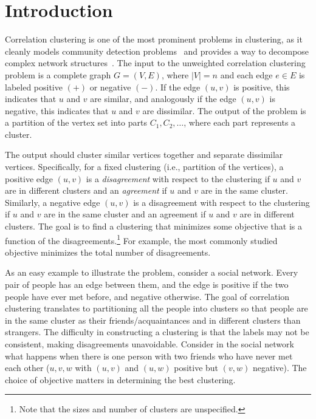 
\section{Introduction}
Correlation clustering is one of the most prominent problems in clustering, 
as it cleanly models community detection problems~\cite{veldt2018, SDELM21} and provides a way to decompose complex network structures~\cite{Wirth17, mccallum2004conditional}. 
The input to the unweighted correlation clustering problem is a complete graph $G=(V,E)$, where $|V|=n$ and each edge $e \in E$ is labeled positive $(+)$ or negative $(-)$.  
If the edge $(u,v)$ is positive, this indicates that $u$ and $v$ are similar, 
and analogously if the edge $(u,v)$ is negative, this indicates that $u$ and $v$ are dissimilar. 
The output of the problem is a partition of the vertex set into parts $C_1, C_2, \ldots$, where each part represents a cluster.   

The output should cluster similar vertices together and separate dissimilar vertices.
Specifically, for a fixed clustering (i.e., partition of the vertices), a positive edge $(u, v)$ is a \emph{disagreement} with respect to the clustering if $u$ and $v$ are in different clusters and an \emph{agreement} if $u$ and $v$ are in the same cluster.
Similarly, a negative edge $(u,v)$ is a disagreement with respect to the clustering if $u$ and $v$ are in the same cluster 
and an agreement if $u$ and $v$ are in different clusters.  
The goal is to find a clustering that minimizes some objective
that is a function of the disagreements.\footnote{Note that the sizes and number of clusters are unspecified.}
For example, the most commonly studied objective minimizes the total number of disagreements.



As an easy example to illustrate the problem,
consider a social network. Every pair of people has an edge between them, 
and the edge is positive if the two people have ever met before, and negative otherwise.
The goal of correlation clustering translates to partitioning all the people into clusters so that people are in the same cluster as their friends/acquaintances and in different clusters than strangers. 
The difficulty in constructing a clustering is that the labels may not be consistent, making disagreements unavoidable. Consider in the social network what happens when there is one person with two friends who have never met each other ($u,v,w$ with $(u,v)$ and $(u,w)$ positive but $(v,w)$ negative).
The choice of objective matters in determining the best clustering.


